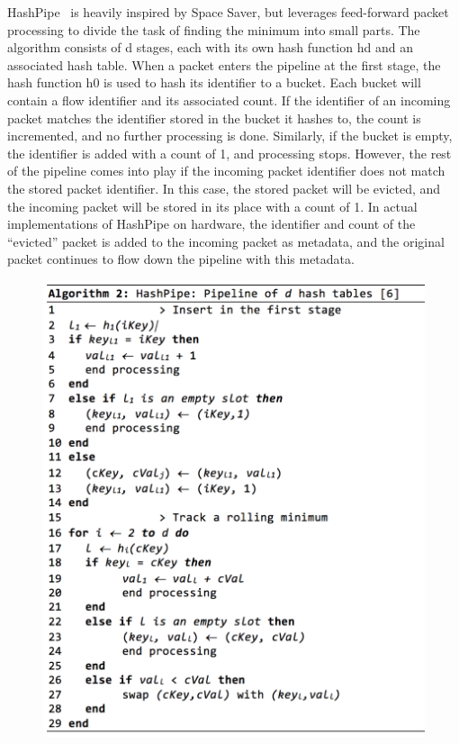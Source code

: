 HashPipe~\cite{hashpipe} is heavily inspired by Space Saver, but leverages feed-forward packet processing to divide the task of finding the minimum into small parts. The algorithm consists of d stages, each with its own hash function hd and an associated hash table. When a packet enters the pipeline at the first stage, the hash function h0 is used to hash its identifier to a bucket. Each bucket will contain a flow identifier and its associated count. If the identifier of an incoming packet matches the identifier stored in the bucket it hashes to, the count is incremented, and no further processing is done. Similarly, if the bucket is empty, the identifier is added with a count of 1, and processing stops. However, the rest of the pipeline comes into play if the incoming packet identifier does not match the stored packet identifier. In this case, the stored packet will be evicted, and the incoming packet will be stored in its place with a count of 1. In actual implementations of HashPipe on hardware, the identifier and count of the “evicted” packet is added to the incoming packet as metadata, and the original packet continues to flow down the pipeline with this metadata.

\begin{figure}[t]
  \centering
    \includegraphics[scale=0.42]{alg2}
     \label{fig:bp-image}
\end{figure}


